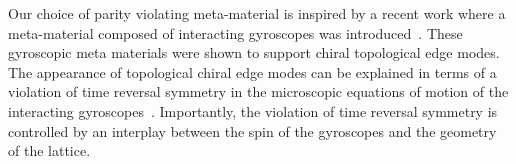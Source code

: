 \documentclass[
 preprint,
 preprintnumbers,
 amsmath,amssymb,
 aps,
 pre,
 longbibliography,
 superscriptaddress,
 10pt, twocolumn
]{revtex4-1}
\begin{document}

Our choice of parity violating meta-material is inspired by a recent work where a meta-material composed of interacting gyroscopes was introduced~\cite{Nash2015TopologicalMechanics}. These gyroscopic meta materials were shown to support chiral topological edge modes. The appearance of topological chiral edge modes can be explained in terms of a violation of time reversal symmetry in the microscopic equations of motion of the interacting gyroscopes~\cite{Nash2015TopologicalMechanics,Mitchell2018AmorphousTopological}. Importantly, the violation of time reversal symmetry is controlled by an interplay between the spin of the gyroscopes and the geometry of the lattice.  %
\end{document}
